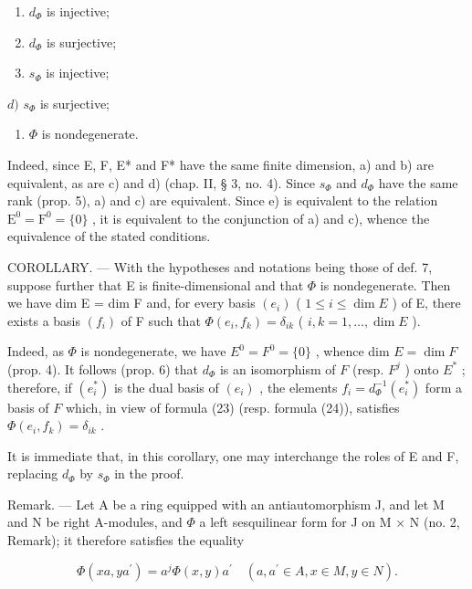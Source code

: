 \begin{enumerate}
\def\labelenumi{\alph{enumi})}
\item
  \(d_{\Phi}\) is injective;
\item
  \(d_{\Phi}\) is surjective;
\item
  \(s_{\Phi}\) is injective;
\end{enumerate}

\(d)\) \(s_{\Phi}\) is surjective;

\begin{enumerate}
\def\labelenumi{\alph{enumi})}
\setcounter{enumi}{4}
\tightlist
\item
  \(\Phi\) is nondegenerate.
\end{enumerate}

Indeed, since E, F, E* and F* have the same finite dimension, a) and b) are equivalent, as are c) and d) (chap. II, § 3, no. 4). Since \(s_{\Phi}\) and \(d_{\Phi}\) have the same rank (prop. 5), a) and c) are equivalent. Since e) is equivalent to the relation \(\mathrm{E}^{0} = \mathrm{F}^{0} = \{0\}\) , it is equivalent to the conjunction of a) and c), whence the equivalence of the stated conditions.

COROLLARY. --- With the hypotheses and notations being those of def. 7, suppose further that E is finite-dimensional and that \(\Phi\) is nondegenerate. Then we have dim E = dim F and, for every basis \((e_i)\) ( \(1 \leqslant i \leqslant \dim E\) ) of E, there exists a basis \((f_i)\) of F such that \(\Phi(e_i, f_k) = \delta_{ik}\) ( \(i, k = 1, \ldots, \dim E\) ).

Indeed, as \(\Phi\) is nondegenerate, we have \(E^{0} = F^{0} = \{0\}\) , whence dim \(E = \dim F\) (prop. 4). It follows (prop. 6) that \(d_{\Phi}\) is an isomorphism of \(F\) (resp. \(F^{j}\) ) onto \(E^{*}\) ; therefore, if \((e_{i}^{*})\) is the dual basis of \((e_{i})\) , the elements \(f_{i} = d_{\Phi}^{-1}(e_{i}^{*})\) form a basis of \(F\) which, in view of formula (23) (resp. formula (24)), satisfies \(\Phi(e_{i}, f_{k}) = \delta_{ik}\) .

It is immediate that, in this corollary, one may interchange the roles of E and F, replacing \(d_{\Phi}\) by \(s_{\Phi}\) in the proof.

Remark. --- Let A be a ring equipped with an antiautomorphism J, and let M and N be right A-modules, and \(\Phi\) a left sesquilinear form for J on M × N (no. 2, Remark); it therefore satisfies the equality

\[
\Phi (x a, y a ^ {\prime}) = a ^ {j} \Phi (x, y) a ^ {\prime} \quad (a, a ^ {\prime} \in A, x \in M, y \in N).
\]

